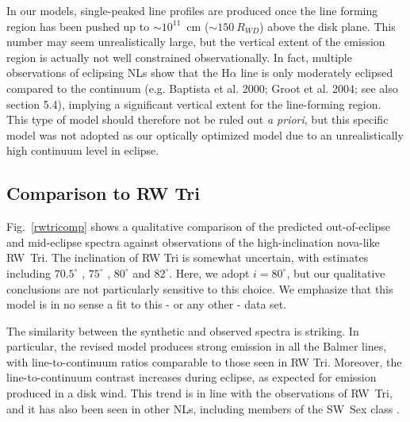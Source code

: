 \documentclass[preprint, a4paper, 11pt]{aastex}
\begin{document}
In our models, single-peaked line profiles are produced once the line forming region has been
pushed up to $\sim 10^{11}$~cm ($\sim150~R_{WD}$) above the disk plane. 
This number may seem unrealistically large, but the vertical extent of 
the emission region is actually not well constrained observationally. 
In fact, multiple observations of eclipsing NLs show that the H$\alpha$ 
line is only moderately eclipsed compared to the continuum (e.g. Baptista et al. 2000;
Groot et al. 2004; see also section 5.4), 
implying a significant vertical extent for the line-forming 
region. This type of model should therefore not be ruled out {\em a priori}, 
but this specific model was not adopted as our optically optimized model
due to an unrealistically high continuum level in eclipse. 




\subsection{Comparison to RW Tri}


Fig.~\ref{rwtricomp} shows a qualitative comparison of the predicted
out-of-eclipse and mid-eclipse spectra against observations of the
high-inclination nova-like RW~Tri. The inclination of RW Tri is
somewhat uncertain, with estimates including $70.5^\circ$
\citep{smak1995}, $75^\circ$ \citep{groot2004}, $80^\circ$
\citep{longmore1981} and $82^\circ$\citep{frankking1981}. Here, we
adopt $i = 80^\circ$, but our qualitative conclusions are not
particularly sensitive to this choice. We emphasize that this
model is in no sense a fit to this - or any other - data set.


The similarity between the synthetic and observed spectra is
striking. In particular, the revised model produces strong emission in
all the Balmer lines, with line-to-continuum ratios comparable to
those seen in RW Tri. Moreover, the line-to-continuum contrast
increases during eclipse, as expected for emission produced in a disk
wind. This trend is in line with the observations of RW~Tri, and it
has also been seen in other NLs, including members of the SW~Sex class
\citep{neustroev2011}.
\end{document}
